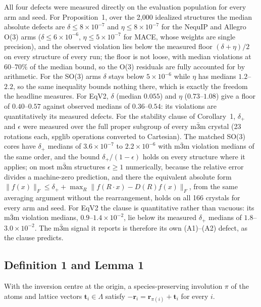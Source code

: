 All four defects were measured directly on the evaluation population for every arm and seed. For Proposition~1, over the 2,000 idealized structures the median absolute defects are $\delta \le 8\times10^{-7}$ and $\eta \le 8\times10^{-7}$ for the NequIP and Allegro O(3) arms ($\delta \le 6\times10^{-6}$, $\eta \le 5\times10^{-7}$ for MACE, whose weights are single precision), and the observed violation lies below the measured floor $(\delta+\eta)/2$ on every structure of every run; the floor is not loose, with median violations at $60$--$70\%$ of the median bound, so the O(3) residuals are fully accounted for by arithmetic. For the SO(3) arms $\delta$ stays below $5\times10^{-6}$ while $\eta$ has medians $1.2$--$2.2$, so the same inequality bounds nothing there, which is exactly the freedom the headline measures. For EqV2, $\delta$ (median $0.055$) and $\eta$ ($0.73$--$1.08$) give a floor of $0.40$--$0.57$ against observed medians of $0.36$--$0.54$: its violations are quantitatively its measured defects. For the stability clause of Corollary~1, $\delta_{+}$ and $\epsilon$ were measured over the full proper subgroup of every m$\bar 3$m crystal (23 rotations each, spglib operations converted to Cartesian). The matched SO(3) cores have $\delta_{+}$ medians of $3.6\times10^{-7}$ to $2.2\times10^{-6}$ with m$\bar 3$m violation medians of the same order, and the bound $\delta_{+}/(1-\epsilon)$ holds on every structure where it applies; on most m$\bar 3$m structures $\epsilon \ge 1$ numerically, because the relative error divides a machine-zero prediction, and there the equivalent absolute form $\lVert f(x)\rVert_F \le \delta_{+} + \max_{R}\lVert f(R\!\cdot\!x) - D(R)f(x)\rVert_F$, from the same averaging argument without the rearrangement, holds on all 166 crystals for every arm and seed. For EqV2 the clause is quantitative rather than vacuous: its m$\bar 3$m violation medians, $0.9$--$1.4\times10^{-2}$, lie below its measured $\delta_{+}$ medians of $1.8$--$3.0\times10^{-2}$. The m$\bar 3$m signal it reports is therefore its own (A1)--(A2) defect, as the clause predicts.

\subsection*{Definition 1 and Lemma 1}

\begin{definition}\label{sdef:centro}
With the inversion centre at the origin, a species-preserving involution $\pi$ of the atoms and lattice vectors $\mathbf{t}_i \in \Lambda$ satisfy $-\mathbf{r}_i = \mathbf{r}_{\pi(i)} + \mathbf{t}_i$ for every $i$.
\end{definition}

